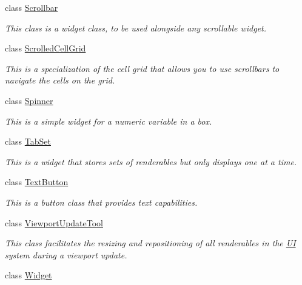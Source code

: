\begin{DoxyCompactItemize}
class \hyperlink{classMezzanine_1_1UI_1_1Scrollbar}{Scrollbar}
\begin{DoxyCompactList}\small\item\em This class is a widget class, to be used alongside any scrollable widget. \item\end{DoxyCompactList}\item 
class \hyperlink{classMezzanine_1_1UI_1_1ScrolledCellGrid}{ScrolledCellGrid}
\begin{DoxyCompactList}\small\item\em This is a specialization of the cell grid that allows you to use scrollbars to navigate the cells on the grid. \item\end{DoxyCompactList}\item 
class \hyperlink{classMezzanine_1_1UI_1_1Spinner}{Spinner}
\begin{DoxyCompactList}\small\item\em This is a simple widget for a numeric variable in a box. \item\end{DoxyCompactList}\item 
class \hyperlink{classMezzanine_1_1UI_1_1TabSet}{TabSet}
\begin{DoxyCompactList}\small\item\em This is a widget that stores sets of renderables but only displays one at a time. \item\end{DoxyCompactList}\item 
class \hyperlink{classMezzanine_1_1UI_1_1TextButton}{TextButton}
\begin{DoxyCompactList}\small\item\em This is a button class that provides text capabilities. \item\end{DoxyCompactList}\item 
class \hyperlink{classMezzanine_1_1UI_1_1ViewportUpdateTool}{ViewportUpdateTool}
\begin{DoxyCompactList}\small\item\em This class facilitates the resizing and repositioning of all renderables in the \hyperlink{namespaceMezzanine_1_1UI}{UI} system during a viewport update. \item\end{DoxyCompactList}\item 
class \hyperlink{classMezzanine_1_1UI_1_1Widget}{Widget}

\end{DoxyCompactItemize}

